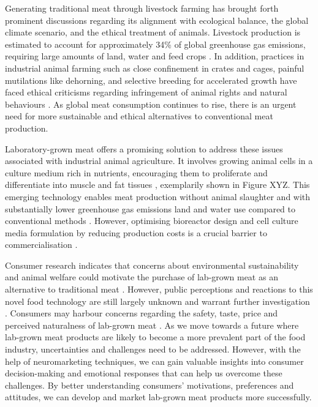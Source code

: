 \documentclass[10pt]{article}
\begin{document}
\begin{sloppypar}
  Generating traditional meat through livestock farming has brought forth prominent discussions regarding its alignment with ecological balance, the global climate scenario, and the ethical treatment of animals. Livestock production is estimated to account for approximately 34\% of global greenhouse gas emissions, requiring large amounts of land, water and feed crops \citep{tuomisto_environmental_2011}. In addition, practices in industrial animal farming such as close confinement in crates and cages, painful mutilations like dehorning, and selective breeding for accelerated growth have faced ethical criticisms regarding infringement of animal rights and natural behaviours \citep{stephens_bringing_2018}. As global meat consumption continues to rise, there is an urgent need for more sustainable and ethical alternatives to conventional meat production.


  Laboratory-grown meat offers a promising solution to address these issues associated with industrial animal agriculture. It involves growing animal cells in a culture medium rich in nutrients, encouraging them to proliferate and differentiate into muscle and fat tissues \citep{datar_possibilities_2010}, exemplarily shown in Figure XYZ. This emerging technology enables meat production without animal slaughter and with substantially lower greenhouse gas emissions land and water use compared to conventional methods \citep{tuomisto_environmental_2011}. However, optimising bioreactor design and cell culture media formulation by reducing production costs is a crucial barrier to commercialisation \citep{specht_opportunities_2018}.

  Consumer research indicates that concerns about environmental sustainability and animal welfare could motivate the purchase of lab-grown meat as an alternative to traditional meat \citep{circus_exploring_2018}. However, public perceptions and reactions to this novel food technology are still largely unknown and warrant further investigation \citep{verbeke_would_2015}. Consumers may harbour concerns regarding the safety, taste, price and perceived naturalness of lab-grown meat \citep{bryant_consumer_2018}. As we move towards a future where lab-grown meat products are likely to become a more prevalent part of the food industry, uncertainties and challenges need to be addressed. However, with the help of neuromarketing techniques, we can gain valuable insights into consumer decision-making and emotional responses that can help us overcome these challenges. By better understanding consumers’ motivations, preferences and attitudes, we can develop and market lab-grown meat products more successfully.


\end{sloppypar}
\end{document}
